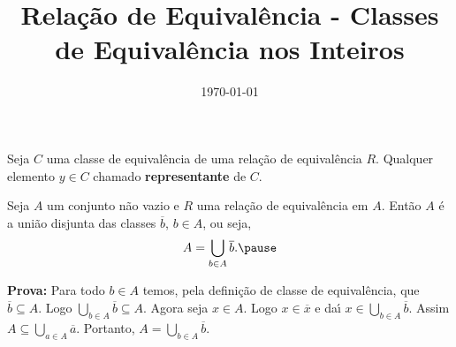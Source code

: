 \documentclass{beamer}
\title{Rela\c{c}\~ao de Equival\^encia - Classes de Equivalência nos Inteiros}
\author[\autor]{\autor}
\institute[\instituto]{\instituto}
\date{\today}
\begin{document}
    \begin{frame}
        \maketitle
    \end{frame}


    \begin{frame}
        \begin{definicao}
            Seja $C$ uma classe de equival{\^e}ncia \pause de uma rela{\c c}{\~a}o de equival{\^e}ncia $R$. \pause Qualquer elemento $y\in C$  chamado \textbf{representante} de $C$.\pause
        \end{definicao}

        \begin{proposicao}
            Seja $A$ um conjunto n{\~a}o vazio \pause e $R$ uma rela{\c c}{\~a}o de equival{\^e}ncia em $A$. \pause Ent{\~a}o $A$ {\'e} a uni{\~a}o disjunta das classes $\overline{b}$, $b \in A$, ou seja,\pause
            \[
                A = \bigcup_{b\in A}\overline{b}.\pause
            \]
        \end{proposicao}
        \noindent\textbf{Prova:}
            Para todo $b\in A$ temos, \pause pela defini\c{c}\~ao de classe de equival\^encia, que $\overline{b}\subseteq A$. \pause Logo $\bigcup_{b\in A}\overline{b}\subseteq A$. \pause Agora seja $x\in A$. \pause Logo $x \in \overline{x}$ \pause e da{\'\i} $x\in \bigcup_{b\in A}\overline{b}$. \pause Assim $A\subseteq\bigcup_{a\in A}\overline{a}$. \pause Portanto, $A=\bigcup_{b\in A}\overline{b}$.\hspace{.5cm}\qedsymbol\pause
    \end{frame}
\end{document}
